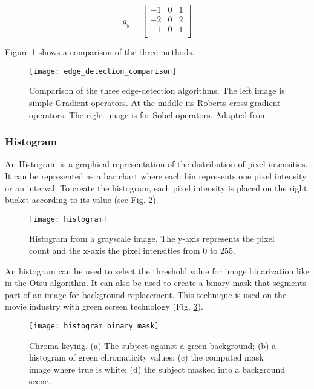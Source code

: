 \begin{equation}
    g_y = \begin{bmatrix}
        -1 & 0 & 1 \\
        -2 & 0 & 2 \\
        -1 & 0 & 1 \\
    \end{bmatrix}
\end{equation}

Figure \ref{fig:edge_detection_comparison} shows a comparison of the three methods.

\begin{figure}[htbp]
	\centering
	\texttt{[image: edge\_detection\_comparison]}
	\caption{Comparison of the three edge-detection algorithms. The left image is simple Gradient operators. At the middle its Roberts cross-gradient operators. The right image is for Sobel operators. Adapted from \cite{Fonseca2017_acondicionamento_imagem}}
	\label{fig:edge_detection_comparison}
\end{figure}


\subsubsection*{Histogram}
\label{subsubsec:image_segmentation_histogram}

An Histogram is a graphical representation of the distribution of pixel intensities. It can be represented as a bar chart where each bin represents one pixel intensity or an interval. To create the histogram, each pixel intensity is placed on the right bucket according to its value (see Fig. \ref{fig:histogram}).

\begin{figure}[htbp]
	\centering
	\texttt{[image: histogram]}
	\caption{Histogram from a grayscale image. The y-axis represents the pixel count and the x-axis the pixel intensities from 0 to 255.}
	\label{fig:histogram}
\end{figure}

An histogram can be used to select the threshold value for image binarization like in the Otsu algorithm. It can also be used to create a binary mask that segments part of an image for background replacement. This technique is used on the movie industry with green screen technology (Fig. \ref{fig:histogram_binary_mask}).

\begin{figure}[htbp]
	\centering
	\texttt{[image: histogram\_binary\_mask]}
	\caption{Chroma-keying. (a) The subject against a green background; (b) a histogram of green chromaticity values; (c) the computed mask image where true is white; (d) the subject masked into
a background scene. \cite{Corke2011_robotics_vision_control}}
	\label{fig:histogram_binary_mask}
\end{figure}

